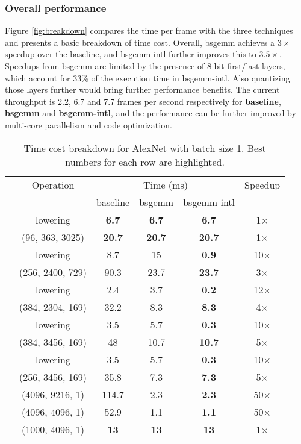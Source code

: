 \documentclass[sigconf]{acmart}
\begin{document}
\subsubsection{Overall performance}
Figure \ref{fig:breakdown} compares the time per frame with the three techniques and presents a basic breakdown of time cost.
Overall, bsgemm achieves a $3\times$ speedup over the baseline, and bsgemm-intl further improves this to $3.5\times$.
Speedups from bsgemm are limited by the presence of 8-bit first/last layers, which account for 33\% of the execution time in bsgemm-intl.
Also quantizing those layers further would bring further performance benefits.
The current throughput is 2.2, 6.7 and 7.7 frames per second respectively for \textbf{baseline}, \textbf{bsgemm} and \textbf{bsgemm-intl}, and the performance can be further improved by multi-core parallelism and code optimization.

\begin{table}
	\centering
	\caption{Time cost breakdown for  AlexNet with batch size 1. Best numbers for each row are highlighted.}
	\label{tab:detailedbreakdown}
	\footnotesize
	\begin{tabular}{@{}cccccc@{}}
		\toprule
&		Operation & \multicolumn{3}{c}{Time (ms)} & Speedup \\
		\cmidrule(r){3-5} 
&		   & baseline       & bsgemm          & bsgemm-intl             &          \\
		\midrule
		\parbox[t]{2mm}{} &
		lowering & \textbf{6.7} & \textbf{6.7} & \textbf{6.7} & 1$\times$ \\ 
&		(96, 363, 3025) & \textbf{20.7} & \textbf{20.7} & \textbf{20.7} & 1$\times$ \\
&		lowering & 8.7 & 15 & \textbf{0.9} & 10$\times$ \\
&		(256, 2400, 729) & 90.3 & 23.7 & \textbf{23.7} & 3$\times$ \\
&		lowering & 2.4 & 3.7 & \textbf{0.2} & 12$\times$ \\
&		(384, 2304, 169) & 32.2 & 8.3 & \textbf{8.3} & 4$\times$ \\
&		lowering & 3.5 & 5.7 & \textbf{0.3} & 10$\times$ \\
&		(384, 3456, 169) & 48 & 10.7 & \textbf{10.7} & 5$\times$ \\
&		lowering & 3.5 & 5.7 & \textbf{0.3} & 10$\times$ \\
&		(256, 3456, 169) & 35.8 & 7.3 & \textbf{7.3} & 5$\times$ \\
		\midrule
		\parbox[t]{2mm}{} 
&		(4096, 9216, 1)  & 114.7 & 2.3 & \textbf{2.3} & 50$\times$ \\
&		(4096, 4096, 1)  & 52.9 & 1.1 & \textbf{1.1} & 50$\times$ \\
&		(1000, 4096, 1)  & \textbf{13} & \textbf{13} & \textbf{13} & 1$\times$	\\ 
		\bottomrule
		
	\end{tabular}
\end{table}
\end{document}
